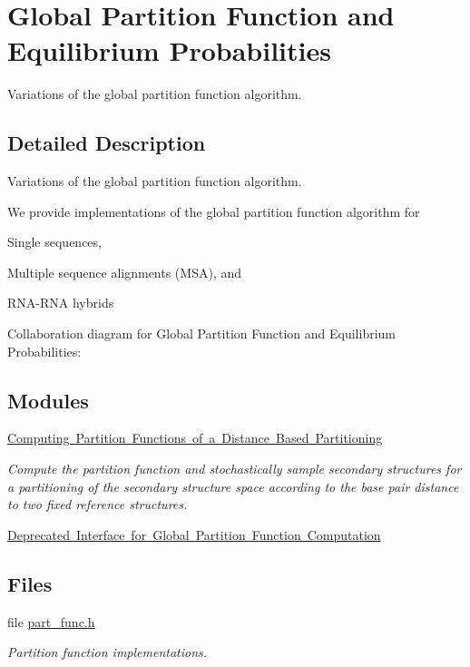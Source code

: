 \hypertarget{group__part__func__global}{}\section{Global Partition Function and Equilibrium Probabilities}
\label{group__part__func__global}


Variations of the global partition function algorithm.  




\subsection{Detailed Description}
Variations of the global partition function algorithm. 

We provide implementations of the global partition function algorithm for
\begin{DoxyItemize}
\item Single sequences,
\item Multiple sequence alignments (M\+SA), and
\item R\+N\+A-\/\+R\+NA hybrids 
\end{DoxyItemize}Collaboration diagram for Global Partition Function and Equilibrium Probabilities\+:
\subsection*{Modules}
\begin{DoxyCompactItemize}
\item 
\mbox{\hyperlink{group__kl__neighborhood__pf}{Computing Partition Functions of a Distance Based Partitioning}}
\begin{DoxyCompactList}\small\item\em Compute the partition function and stochastically sample secondary structures for a partitioning of the secondary structure space according to the base pair distance to two fixed reference structures. \end{DoxyCompactList}\item 
\mbox{\hyperlink{group__part__func__global__deprecated}{Deprecated Interface for Global Partition Function Computation}}
\end{DoxyCompactItemize}
\subsection*{Files}
\begin{DoxyCompactItemize}
\item 
file \mbox{\hyperlink{part__func_8h}{part\+\_\+func.\+h}}
\begin{DoxyCompactList}\small\item\em Partition function implementations. \end{DoxyCompactList}\end{DoxyCompactItemize}
